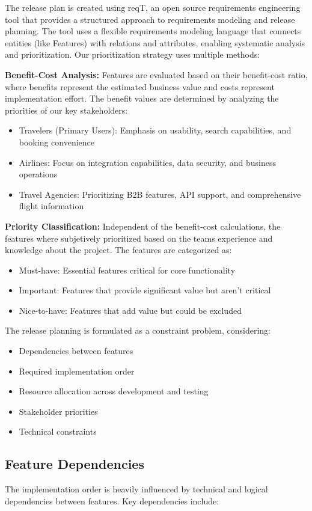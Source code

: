The release plan is created using reqT, an open source requirements engineering tool that provides a structured approach to requirements modeling and release planning. The tool uses a flexible requirements modeling language that connects entities (like Features) with relations and attributes, enabling systematic analysis and prioritization. Our prioritization strategy uses multiple methods:

\textbf{Benefit-Cost Analysis:} Features are evaluated based on their benefit-cost ratio, where benefits represent the estimated business value and costs represent implementation effort. The benefit values are determined by analyzing the priorities of our key stakeholders:
\begin{itemize}
\item Travelers (Primary Users): Emphasis on usability, search capabilities, and booking convenience
\item Airlines: Focus on integration capabilities, data security, and business operations
\item Travel Agencies: Prioritizing B2B features, API support, and comprehensive flight information
\end{itemize}

\textbf{Priority Classification:} Independent of the benefit-cost calculations, the features where subjetively prioritized based on the teams experience and knowledge about the project. The features are categorized as:
\begin{itemize}
\item Must-have: Essential features critical for core functionality
\item Important: Features that provide significant value but aren't critical
\item Nice-to-have: Features that add value but could be excluded
\end{itemize}

The release planning is formulated as a constraint problem, considering:
\begin{itemize}
\item Dependencies between features
\item Required implementation order
\item Resource allocation across development and testing
\item Stakeholder priorities
\item Technical constraints
\end{itemize}

\subsection{Feature Dependencies}
The implementation order is heavily influenced by technical and logical dependencies between features. Key dependencies include:

